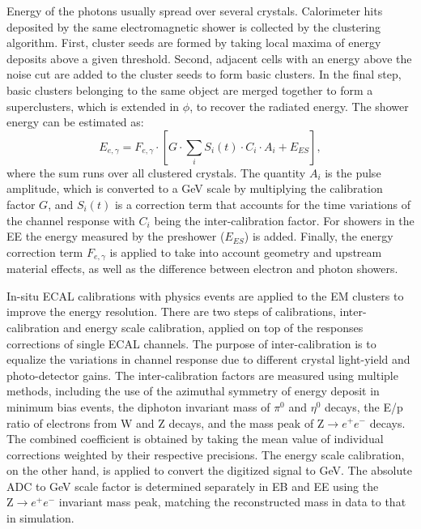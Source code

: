 \documentclass[thesis.tex]{subfiles}
\begin{document}
Energy of the photons usually spread over several crystals. 
Calorimeter hits deposited by the same electromagnetic shower is collected by the clustering algorithm. 
First, cluster seeds are formed by taking local maxima of energy deposits above a given threshold. 
Second, adjacent cells with an energy above the noise cut are added to the cluster seeds to form basic clusters. 
In the final step, basic clusters belonging to the same object are merged together to form a superclusters, which is extended in $\phi$, to recover the radiated energy. 
The shower energy can be estimated as:
\begin{equation}
      E_{e, \gamma} = F_{e, \gamma} \cdot [ G \cdot  \displaystyle\sum_{i} S_i(t) \cdot C_i \cdot A_i + E_{ES}],
\end{equation}
where the sum runs over all clustered crystals. The quantity $A_i$ is the pulse
amplitude, which is converted to a GeV scale by multiplying the calibration
factor $G$, and $S_i(t)$ is a correction term that accounts for the time
variations of the channel response with $C_i$ being the inter-calibration
factor. For showers in the EE the energy measured by the preshower
($E_{ES}$) is added. Finally, the energy correction term $F_{e, \gamma}$
is applied to take into account geometry and upstream material
effects, as well as the difference between electron and photon showers. 

In-situ ECAL calibrations with physics events are applied to the EM clusters to improve the energy resolution. 
There are two steps of calibrations, inter-calibration and energy scale calibration, applied on top of the responses corrections of single ECAL channels. 
The purpose of inter-calibration is to equalize the variations in channel response due to different crystal light-yield and photo-detector gains. 
The inter-calibration factors are measured using multiple methods, including the use of the azimuthal symmetry of energy deposit in minimum bias events, the diphoton invariant mass of $\pi^0$ and $\eta^0$ decays, the E/p ratio of electrons from W and Z decays, and the mass peak of $\mathrm{Z}\rightarrow e^+e^-$ decays. 
The combined coefficient is obtained by taking the mean value of individual corrections weighted by their respective precisions. 
The energy scale calibration, on the other hand, is applied to convert the digitized signal to GeV. 
The absolute ADC to GeV scale factor is determined separately in EB and EE using the $\mathrm{Z}\rightarrow e^+e^-$ invariant mass peak, matching the reconstructed mass in data to that in simulation. 
\end{document}
